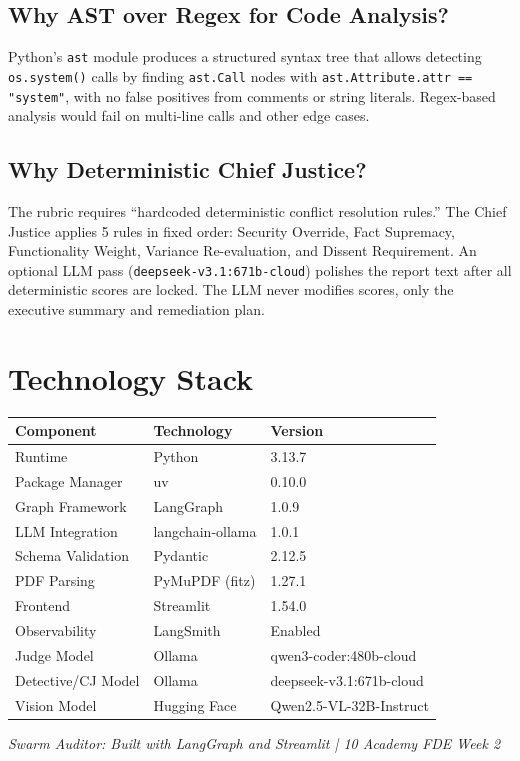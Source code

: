 \documentclass[11pt,a4paper]{article}
\begin{document}
\subsection{Why AST over Regex for Code Analysis?}

Python's \texttt{ast} module produces a structured syntax tree that allows
detecting \texttt{os.system()} calls by finding \texttt{ast.Call} nodes with
\texttt{ast.Attribute.attr == "system"}, with no false positives from comments
or string literals.  Regex-based analysis would fail on multi-line calls
and other edge cases.

\subsection{Why Deterministic Chief Justice?}

The rubric requires ``hardcoded deterministic conflict resolution rules.''
The Chief Justice applies 5 rules in fixed order:
Security Override, Fact Supremacy, Functionality Weight,
Variance Re-evaluation, and Dissent Requirement.
An optional LLM pass (\texttt{deepseek-v3.1:671b-cloud})
polishes the report text after all deterministic scores are locked.
The LLM never modifies scores, only the executive summary and remediation plan.

\section{Technology Stack}

\begin{table}[H]
\centering
\begin{tabular}{@{}lll@{}}
\toprule
\textbf{Component} & \textbf{Technology} & \textbf{Version} \\
\midrule
Runtime             & Python              & 3.13.7 \\
Package Manager     & uv                  & 0.10.0 \\
Graph Framework     & LangGraph           & 1.0.9 \\
LLM Integration     & langchain-ollama    & 1.0.1 \\
Schema Validation   & Pydantic            & 2.12.5 \\
PDF Parsing         & PyMuPDF (fitz)      & 1.27.1 \\
Frontend            & Streamlit           & 1.54.0 \\
Observability       & LangSmith           & Enabled \\
Judge Model         & Ollama              & qwen3-coder:480b-cloud \\
Detective/CJ Model  & Ollama              & deepseek-v3.1:671b-cloud \\
Vision Model        & Hugging Face        & Qwen2.5-VL-32B-Instruct \\
\bottomrule
\end{tabular}
\end{table}

\vfill
\begin{center}
\small\textit{Swarm Auditor: Built with LangGraph and Streamlit | 10 Academy FDE Week 2}
\end{center}
\end{document}
